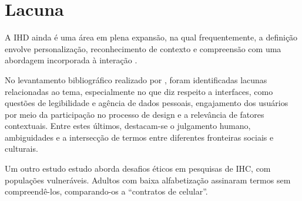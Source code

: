 \documentclass[
	12pt,				%
	oneside,			%
	a4paper,			%
	english,			%
	brazil				%
	]{abntex2ppgsi}
\begin{document}
 
   
    \section{Lacuna}

  A IHD ainda é uma área em plena expansão, na qual frequentemente, a definição envolve personalização, reconhecimento de contexto e compreensão com uma abordagem incorporada à interação \cite{VICTORELLI2020Understanding}.
  
  No levantamento bibliográfico realizado por , foram identificadas lacunas relacionadas ao tema, especialmente no que diz respeito a interfaces, como questões de legibilidade e agência de dados pessoais, engajamento dos usuários por meio da participação no processo de design e a relevância de fatores contextuais. Entre estes últimos, destacam-se o julgamento humano, ambiguidades e a intersecção de termos entre diferentes fronteiras sociais e culturais.

  Um outro estudo estudo \cite{Munteanu} aborda desafios éticos em pesquisas de IHC, com populações vulneráveis. Adultos com baixa alfabetização assinaram termos sem compreendê-los, comparando-os a ``contratos de celular''. 
\end{document}
